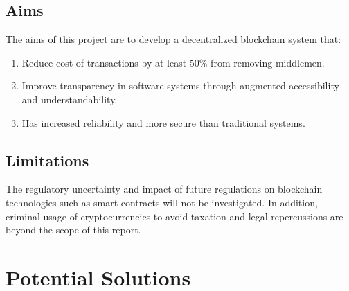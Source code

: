 \documentclass[12pt]{scrreprt}
\begin{document}
\begin{appendices}
\subsection{Aims}
The aims of this project are to develop a decentralized blockchain system that:
\begin{enumerate}
\item Reduce cost of transactions by at least 50\% from removing middlemen.
\item Improve transparency in software systems through augmented accessibility and understandability.
\item Has increased reliability and more secure than traditional systems.
\end{enumerate}
\subsection{Limitations}

The regulatory uncertainty and impact of future regulations on blockchain technologies such as smart contracts will not be investigated. In addition, criminal usage of cryptocurrencies to avoid taxation and legal repercussions are beyond the scope of this report. 

\newpage  
\section{Potential Solutions}


\end{appendices}
\end{document}
